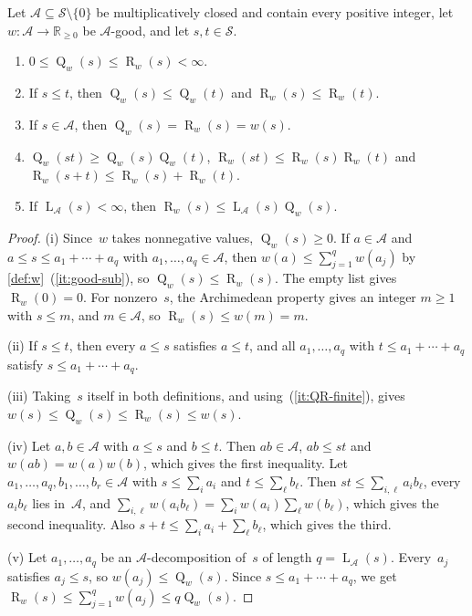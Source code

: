 \documentclass[11pt,letterpaper]{article}
\DeclareMathOperator{\subrank}{Q}
\DeclareMathOperator{\declength}{L}
\DeclareMathOperator{\tensorrank}{R}
\newcommand{\RR}{\mathbb{R}}
\begin{document}
\begin{lemma}\label{lem:QR}
Let $\mathcal{A} \subseteq \mathcal{S} \setminus \{0\}$ be multiplicatively closed and contain every positive integer, let $w : \mathcal{A} \to \RR_{\geq0}$ be $\mathcal{A}$-good, and let $s, t \in \mathcal{S}$.
\begin{enumerate}[\upshape(i)]
\item\label{it:QR-finite} $0 \leq \subrank_w(s) \leq \tensorrank_w(s) < \infty$.
\item\label{it:QR-mono} If $s \leq t$, then $\subrank_w(s) \leq \subrank_w(t)$ and $\tensorrank_w(s) \leq \tensorrank_w(t)$.
\item\label{it:QR-family} If $s \in \mathcal{A}$, then $\subrank_w(s) = \tensorrank_w(s) = w(s)$.
\item\label{it:QR-mult} $\subrank_w(st) \geq \subrank_w(s) \subrank_w(t)$, $\tensorrank_w(st) \leq \tensorrank_w(s) \tensorrank_w(t)$ and $\tensorrank_w(s + t) \leq \tensorrank_w(s) + \tensorrank_w(t)$.
\item\label{it:QR-length} If $\declength_{\mathcal{A}}(s) < \infty$, then $\tensorrank_w(s) \leq \declength_{\mathcal{A}}(s) \subrank_w(s)$.
\end{enumerate}
\end{lemma}
\begin{proof}
(i) Since~$w$ takes nonnegative values, $\subrank_w(s) \geq 0$. If $a \in \mathcal{A}$ and $a \leq s \leq a_1 + \cdots + a_q$ with $a_1, \ldots, a_q \in \mathcal{A}$, then $w(a) \leq \sum_{j=1}^q w(a_j)$ by \cref{def:w}~(\ref{it:good-sub}), so $\subrank_w(s) \leq \tensorrank_w(s)$. The empty list gives $\tensorrank_w(0) = 0$. For nonzero~$s$, the Archimedean property gives an integer $m \geq 1$ with $s \leq m$, and $m \in \mathcal{A}$, so $\tensorrank_w(s) \leq w(m) = m$.

(ii) If $s \leq t$, then every $a \leq s$ satisfies $a \leq t$, and all $a_1, \ldots, a_q$ with $t \leq a_1 + \cdots + a_q$ satisfy $s \leq a_1 + \cdots + a_q$.

(iii) Taking~$s$ itself in both definitions, and using~(\ref{it:QR-finite}), gives $w(s) \leq \subrank_w(s) \leq \tensorrank_w(s) \leq w(s)$.

(iv) Let $a, b \in \mathcal{A}$ with $a \leq s$ and $b \leq t$. Then $ab \in \mathcal{A}$, $ab \leq st$ and $w(ab) = w(a)w(b)$, which gives the first inequality. Let $a_1, \ldots, a_q, b_1, \ldots, b_r \in \mathcal{A}$ with $s \leq \sum_i a_i$ and $t \leq \sum_\ell b_\ell$. Then $st \leq \sum_{i,\ell} a_i b_\ell$, every $a_i b_\ell$ lies in~$\mathcal{A}$, and $\sum_{i,\ell} w(a_i b_\ell) = \sum_i w(a_i) \sum_\ell w(b_\ell)$, which gives the second inequality. Also $s + t \leq \sum_i a_i + \sum_\ell b_\ell$, which gives the third.

(v) Let $a_1, \ldots, a_q$ be an $\mathcal{A}$-decomposition of~$s$ of length $q = \declength_{\mathcal{A}}(s)$. Every~$a_j$ satisfies $a_j \leq s$, so $w(a_j) \leq \subrank_w(s)$. Since $s \leq a_1 + \cdots + a_q$, we get $\tensorrank_w(s) \leq \sum_{j=1}^q w(a_j) \leq q \subrank_w(s)$.
\end{proof}
\end{document}
